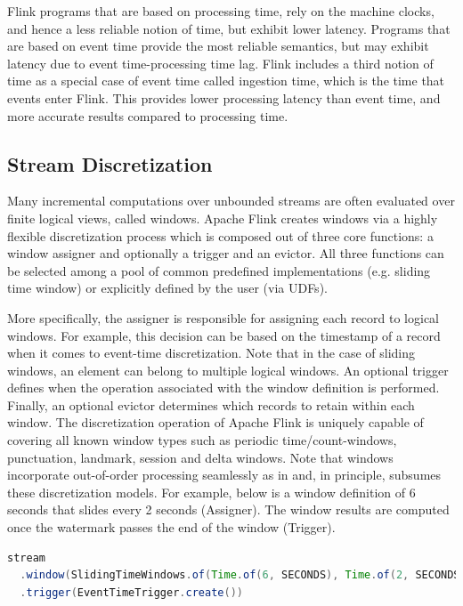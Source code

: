 Flink programs that are based on processing time, rely on the machine clocks, and hence a less reliable notion of time, but exhibit lower latency. Programs that are based on event time provide the most reliable semantics, but may exhibit latency due to event time-processing time lag. Flink includes a third notion of time as a special case of event time called ingestion time, which is the time that events enter Flink. This provides  lower processing latency than event time, and more accurate results compared to processing time.


\subsection{Stream Discretization}
Many incremental computations over unbounded streams are often evaluated over finite logical views, called windows. Apache Flink creates windows via a highly flexible discretization process which is composed out of three core functions: a window assigner and optionally a trigger and an evictor. All three functions can be selected among a pool of common predefined implementations (e.g. sliding time window) or explicitly defined by the user (via UDFs).

More specifically, the assigner is responsible for assigning each record to logical windows. For example, this decision can be based on the timestamp of a record when it comes to event-time discretization. Note that in the case of sliding windows, an element can belong to multiple logical windows. An optional trigger defines when the operation associated with the window definition is performed. Finally, an optional evictor determines which records to retain within each window. The discretization operation of Apache Flink is uniquely capable of covering all known window types such as periodic time/count-windows, punctuation, landmark, session and delta windows. Note that windows incorporate out-of-order processing seamlessly as in \cite{li2005semantics, akidau2015dataflow} and, in principle, subsumes these discretization models. For example, below is a window definition of 6 seconds that slides every 2 seconds (Assigner). The window results are computed once the watermark passes the end of the window (Trigger).

\begin{lstlisting}[language=Java]
stream
  .window(SlidingTimeWindows.of(Time.of(6, SECONDS), Time.of(2, SECONDS))
  .trigger(EventTimeTrigger.create())
\end{lstlisting}

